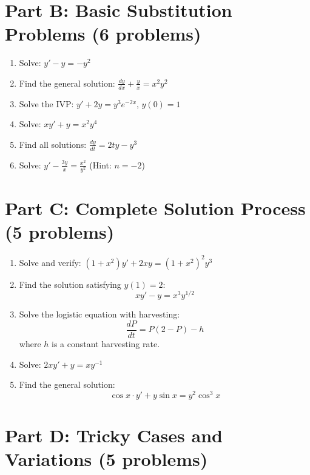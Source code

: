 \documentclass[12pt]{article}
\begin{document}
\section*{Part B: Basic Substitution Problems (6 problems)}

\begin{enumerate}[resume]
    \item Solve: $y' - y = -y^2$

    \item Find the general solution: $\frac{dy}{dx} + \frac{y}{x} = x^2y^2$

    \item Solve the IVP: $y' + 2y = y^3e^{-2x}$, $y(0) = 1$

    \item Solve: $xy' + y = x^2y^4$

    \item Find all solutions: $\frac{dy}{dt} = 2ty - y^3$

    \item Solve: $y' - \frac{3y}{x} = \frac{x^2}{y^2}$ (Hint: $n = -2$)
\end{enumerate}

\section*{Part C: Complete Solution Process (5 problems)}

\begin{enumerate}[resume]
    \item Solve and verify: $(1 + x^2)y' + 2xy = (1 + x^2)^2y^3$

    \item Find the solution satisfying $y(1) = 2$:
    $$xy' - y = x^3y^{1/2}$$

    \item Solve the logistic equation with harvesting:
    $$\frac{dP}{dt} = P(2 - P) - h$$
    where $h$ is a constant harvesting rate.

    \item Solve: $2xy' + y = xy^{-1}$

    \item Find the general solution:
    $$\cos x \cdot y' + y\sin x = y^2\cos^3 x$$
\end{enumerate}

\section*{Part D: Tricky Cases and Variations (5 problems)}
\end{document}
